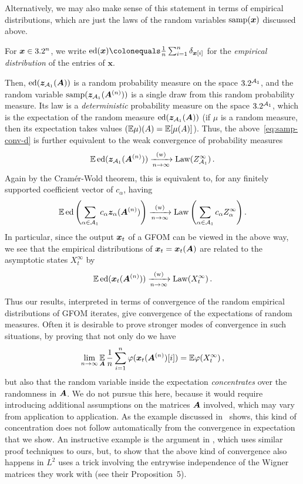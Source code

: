 Alternatively, we may also make sense of this statement in terms of empirical distributions, which are just the laws of the random variables $\mathrm{samp}({\bm x})$ discussed above.
\begin{definition}
    For $\bm x \in 3.2^n$, we write $\ed(\bm x) \colonequals \frac{1}{n} \sum_{i = 1}^n \delta_{\bmx[i]}$ for the \emph{empirical distribution} of the entries of $\bm x$.
\end{definition}
\noindent
Then, $\operatorname{ed}({\bm z}_{{\cal A}_1}({\bm A}))$ is a random probability measure on the space $3.2^{{\cal A}_1}$, and the random variable $\mathrm{samp}({\bm z}_{{\cal A}_1}({\bm A}^{(n)}))$ is a single draw from this random probability measure.
Its law is a \emph{deterministic} probability measure on the space $3.2^{{\cal A}_1}$, which is the expectation of the random measure $\operatorname{ed}({\bm z}_{{\cal A}_1}({\bm A}))$ (if $\mu$ is a random measure, then its expectation takes values $(\mathbb{E} \mu)(A) = \mathbb{E}[\mu(A)]$).
Thus, the above~\cref{eq:samp-conv-d} is further equivalent to the weak convergence of probability measures
\begin{equation*}
\mathbb{E} \operatorname{ed}({\bm z}_{{\cal A}_1}({\bm A}^{(n)})) \xrightarrow[n \to \infty]{\text{(w)}} \operatorname{Law}(Z_{{\cal A}_1}^{\infty})\,.
\end{equation*}
Again by the Cram\'{e}r-Wold theorem, this is equivalent to, for any finitely supported coefficient vector of $c_{\alpha}$, having
\[ \mathbb{E} \operatorname{ed}\left(\sum_{\alpha \in {\cal A}_1} c_{\alpha} {\bm z}_{\alpha}({\bm A}^{(n)})\right) \xrightarrow[n \to \infty]{\text{(w)}} \operatorname{Law}\left(\sum_{\alpha \in {\cal A}_1} c_{\alpha} Z_{\alpha}^{\infty}\right). \]
In particular, since the output ${\bm x}_t$ of a GFOM can be viewed in the above way, we see that the empirical distributions of ${\bm x}_t = {\bm x}_t({\bm A})$ are related to the asymptotic states $X_t^{\infty}$ by
\[ \mathbb{E} \operatorname{ed}({\bm x}_t({\bm A}^{(n)})) \xrightarrow[n \to \infty]{\text{(w)}} \operatorname{Law}(X_t^{\infty})\,. \]

Thus our results, interpreted in terms of convergence of the random empirical distributions of GFOM iterates, give convergence of the expectations of random measures.
Often it is desirable to prove stronger modes of convergence in such situations, by proving that not only do we have
\[ \lim_{n \to \infty} \operatorname*{\mathbb{E}}_{{\bm A}} \frac{1}{n} \sum_{i = 1}^n \varphi({\bm x}_t({\bm A}^{(n)})[i]) = \mathbb{E} \varphi(X_t^{\infty})\,, \]
but also that the random variable inside the expectation \emph{concentrates} over the randomness in ${\bm A}$.
We do not pursue this here, because it would require introducing additional assumptions on the matrices ${\bm A}$ involved, which may vary from application to application.
As the example discussed in~ shows, this kind of concentration does not follow automatically from the convergence in expectation that we show.
An instructive example is the argument in \cite{bayati2015universality}, which uses similar proof techniques to ours, but, to show that the above kind of convergence also happens in $L^2$ uses a trick involving the entrywise independence of the Wigner matrices they work with (see their Proposition~5).

